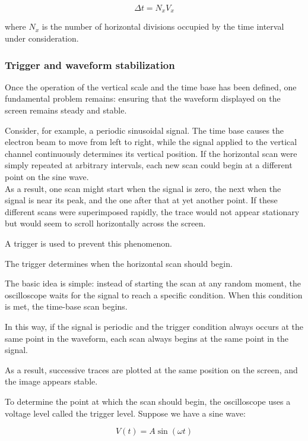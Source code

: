 \documentclass[../main.tex]{subfiles}
\begin{document}
\begin{equation}
	\Delta t=N_xV_x
\end{equation}

where $N_x$ is the number of horizontal divisions occupied by the time interval under consideration.


\subsubsection{Trigger and waveform stabilization}

Once the operation of the vertical scale and the time base has been defined, one fundamental problem remains: ensuring that the waveform displayed on the screen remains steady and stable.

Consider, for example, a periodic sinusoidal signal. The time base causes the electron beam to move from left to right, while the signal applied to the vertical channel continuously determines its vertical position. If the horizontal scan were simply repeated at arbitrary intervals, each new scan could begin at a different point on the sine wave.\\

As a result, one scan might start when the signal is zero, the next when the signal is near its peak, and the one after that at yet another point. If these different scans were superimposed rapidly, the trace would not appear stationary but would seem to scroll horizontally across the screen.

A trigger is used to prevent this phenomenon.

The trigger determines when the horizontal scan should begin.

The basic idea is simple: instead of starting the scan at any random moment, the oscilloscope waits for the signal to reach a specific condition. When this condition is met, the time-base scan begins.

In this way, if the signal is periodic and the trigger condition always occurs at the same point in the waveform, each scan always begins at the same point in the signal.

As a result, successive traces are plotted at the same position on the screen, and the image appears stable.


To determine the point at which the scan should begin, the oscilloscope uses a voltage level called the trigger level. Suppose we have a sine wave:

\begin{equation}
	V(t)=A\sin(\omega t)
\end{equation}
\end{document}
